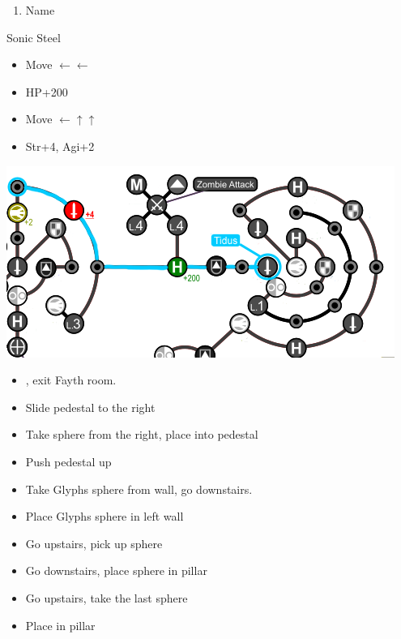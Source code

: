 \begin{enumerate}[resume]
	\item Name \shiva
\end{enumerate}
\begin{equip}
	\begin{itemize}
		\tidusf Sonic Steel
	\end{itemize}
\end{equip}
\vfill
\begin{spheregrid}
	\begin{itemize}
		\tidusf
		\begin{itemize}
			\item Move $\leftarrow\leftarrow$
			\item HP+200
			\item Move $\leftarrow\uparrow\uparrow$
			\item Str+4, Agi+2
		\end{itemize}
		\includegraphics[width=.8\columnwidth]{graphics/Tidus_Post_Seymour}
	\end{itemize}
\end{spheregrid}
\begin{trial}
	\begin{itemize}
		\item \save, exit Fayth room.
		\item Slide pedestal to the right
		\item Take sphere from the right, place into pedestal
		\item Push pedestal up
		\item Take Glyphs sphere from wall, go downstairs.
		\item Place Glyphs sphere in left wall
		\item Go upstairs, pick up sphere
		\item Go downstairs, place sphere in pillar
		\item Go upstairs, take the last sphere
		\item Place in pillar
	\end{itemize}
\end{trial}
